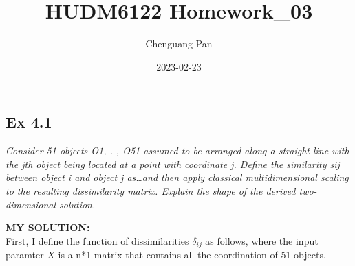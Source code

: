 \documentclass[
]{article}
\title{HUDM6122 Homework\_03}
\author{Chenguang Pan}
\date{2023-02-23}
\begin{document}
\maketitle

\hypertarget{ex-4.1}{%
\subsection{Ex 4.1}\label{ex-4.1}}

\emph{Consider 51 objects O1, . , O51 assumed to be arranged along a
straight line with the jth object being located at a point with
coordinate j. Define the similarity sij between object i and object j
as\ldots and then apply classical multidimensional scaling to the
resulting dissimilarity matrix. Explain the shape of the derived
two-dimensional solution.}

\textbf{MY SOLUTION:}\\
First, I define the function of dissimilarities \(\delta_{ij}\) as
follows, where the input paramter \(X\) is a n*1 matrix that contains
all the coordination of 51 objects.
\end{document}
